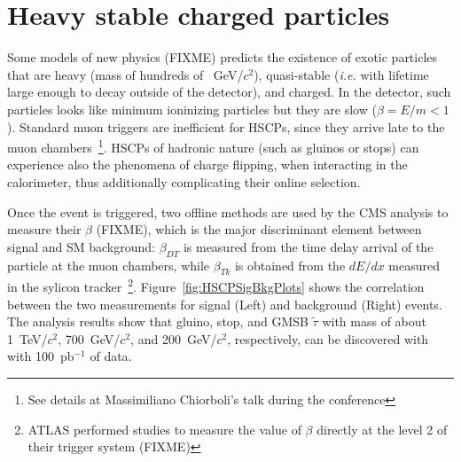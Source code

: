 \documentclass{cimento}
\begin{document}
\section{Heavy stable charged particles} \label{HSCP}
Some models of new physics (FIXME) 
predicts the existence of exotic particles that are 
heavy (mass of hundreds of ~GeV/$c^2$), quasi-stable 
({\it i.e.} with lifetime large enough to decay outside of the detector), 
and charged. In the detector, such particles looks like 
minimum ioninizing particles but they are slow ($\beta=E/m<1$). 
Standard muon triggers are inefficient for HSCPs, since 
they arrive late to the muon chambers~\footnote{See details 
at Massimiliano Chiorboli's talk during the conference
}. HSCPs of hadronic nature (such as gluinos or stops) 
can experience also the phenomena of charge flipping, when interacting 
in the calorimeter, thus additionally complicating their online selection.

Once the event is triggered, two offline methods are used by the 
CMS analysis to measure their $\beta$ (FIXME), 
which is the major discriminant element between signal and SM background:
$\beta_{DT}$ is measured from the time delay arrival of the particle
at the muon chambers, while $\beta_{Tk}$ is obtained 
from the $dE/dx$ measured in the sylicon
tracker~\footnote{ATLAS performed studies to measure 
the value of $\beta$ directly at the level 2 of their trigger system 
(FIXME)}. Figure~\ref{fig:HSCPSigBkgPlots} 
shows the correlation between the two measurements for signal (Left) 
and background (Right) events. The analysis results show that 
gluino, stop, and GMSB $\tilde{\tau}$  with mass of about 
1~TeV/$c^2$, 700~GeV/$c^2$, and 200~GeV/$c^2$, 
respectively, can be discovered with with 100~pb$^{-1}$ of data.
\end{document}
